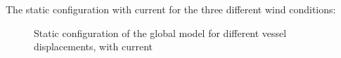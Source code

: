 The static configuration with current for the three different wind conditions: 
\begin{figure}[H]
\hfill
{}\hfill
  \hfill
 \caption [$\; \:$Static configuration of the global model with current]{Static configuration of the global model for different vessel displacements, with current}
\label{fig:statconc}
\end{figure}

